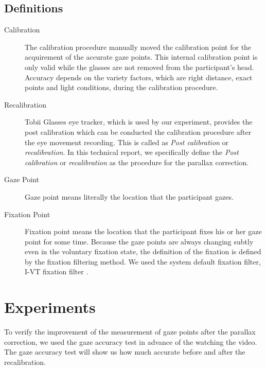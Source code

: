 \documentclass{article}
\begin{document}
\subsection{Definitions}
\label{definitions}
\begin{description}

\item[Calibration]
The calibration procedure manually moved the calibration point for the acquirement of the accurate gaze points. This internal calibration point is only valid while the glasses are not removed from the participant's head. Accuracy depends on the variety factors, which are right distance, exact points and light conditions, during the calibration procedure.

\item[Recalibration]
Tobii Glasses eye tracker, which is used by our experiment, provides the post calibration which can be conducted the calibration procedure after the eye movement recording. This is called as \textit{Post calibration} or \textit{recalibration}. In this technical report, we specifically define the \textit{Post calibration} or \textit{recalibration} as the procedure for the parallax correction.

\item[Gaze Point]
Gaze point means literally the location that the participant gazes.

\item[Fixation Point]
Fixation point means the location that the participant fixes his or her gaze point for some time. Because the gaze points are always changing subtly even in the voluntary fixation state, the definition of the fixation is defined by the fixation filtering method. We used the system default fixation filter, I-VT fixation filter \citep{Salvucci2000}.

\end{description} 
 

\section{Experiments}

To verify the improvement of the measurement of gaze points after the parallax correction, we used the gaze accuracy test in advance of the watching the video. The gaze accuracy test will show us how much accurate before and after the recalibration.
\end{document}

